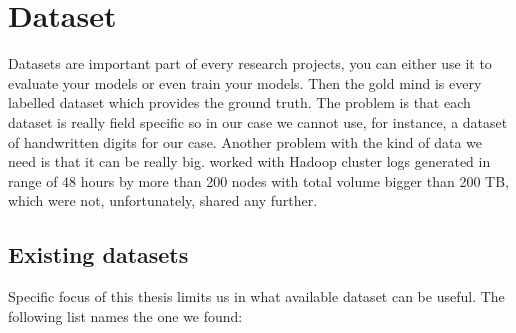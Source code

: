 \chapter{Dataset}
\label{chap:dataset}

Datasets are important part of every research projects, you can either use it to evaluate your models or even train your models. Then the gold mind is every labelled dataset which provides the ground truth. The problem is that each dataset is really field specific so in our case we cannot use, for instance, a dataset of handwritten digits for our case. Another problem with the kind of data we need is that it can be really big. \cite{xu2009detecting} worked with Hadoop cluster logs generated in range of 48 hours by more than 200 nodes with total volume bigger than 200 TB, which were not, unfortunately, shared any further.

\section{Existing datasets}

Specific focus of this thesis limits us in what available dataset can be useful. The following list names the one we found:

